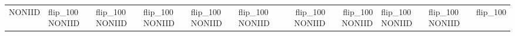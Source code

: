 \begin{tabular}{llllllrrl}
NONIID & flip_100%
NONIID & flip_100%
NONIID & flip_100%
NONIID & flip_100%
NONIID & flip_100%
NONIID & flip_100%
NONIID & flip_100%
NONIID & flip_100%
NONIID & flip_100%
NONIID & flip_100%
\bottomrule
\end{tabular}
